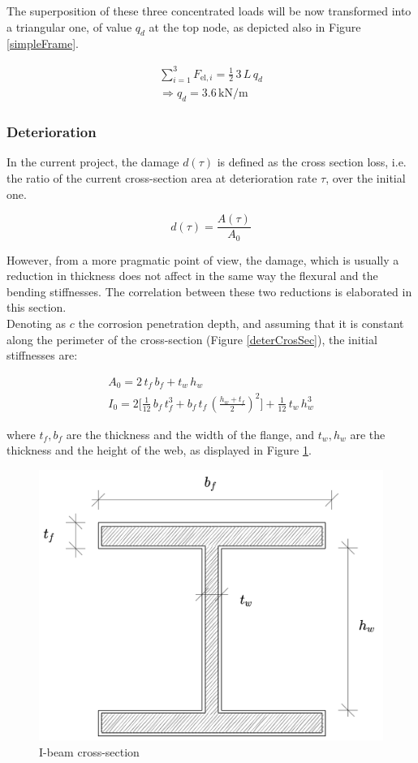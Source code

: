 The superposition of these three concentrated loads will be now transformed into a triangular one, of value $q_d$ at the top node, as depicted also in Figure \ref{simpleFrame}.

\begin{gather}
    \sum _{i=1}^3 F_{\text{el,}\,i} = \frac{1}{2} \, 3 \, L \, q_d \nonumber\\
    \Rightarrow q_d = 3.6 \, \mathrm{kN/m}
\end{gather}

\newpage

\subsubsection{Deterioration} \label{annexDeter}

In the current project, the damage $d(\tau)$ is defined as the cross section loss, i.e. the ratio of the current cross-section area at deterioration rate $\tau$, over the initial one.

$$d(\tau) = \frac{A(\tau)}{A_0}$$

However, from a more pragmatic point of view, the damage, which is usually a reduction in thickness does not affect in the same way the flexural and the bending stiffnesses. The correlation between these two reductions is elaborated in this section.\\

Denoting as $c$ the corrosion penetration depth, and assuming that it is constant along the perimeter of the cross-section (Figure \ref{deterCrosSec}), the initial stiffnesses are:

\begin{gather}
    A_0 = 2 \, t_f \, b_f + t_w \, h_w \\
    I_0 = 2 \big[ \frac{1}{12}\, b_f \, t_f^3 + b_f\, t_f \, (\frac{h_w + t_f}{2})^2\big] + \frac{1}{12}\,t_w\,h_w^3
\end{gather}

where $t_f, b_f$ are the thickness and the width of the flange, and $t_w, h_w$ are the thickness and the height of the web, as displayed in Figure \ref{IPEgeom}.\\

\begin{figure}[H]
    \centering
	\includegraphics[width=0.5\linewidth]{Figures/IPEgeom.png}
	\caption{I-beam cross-section}
	\label{IPEgeom}
\end{figure}

